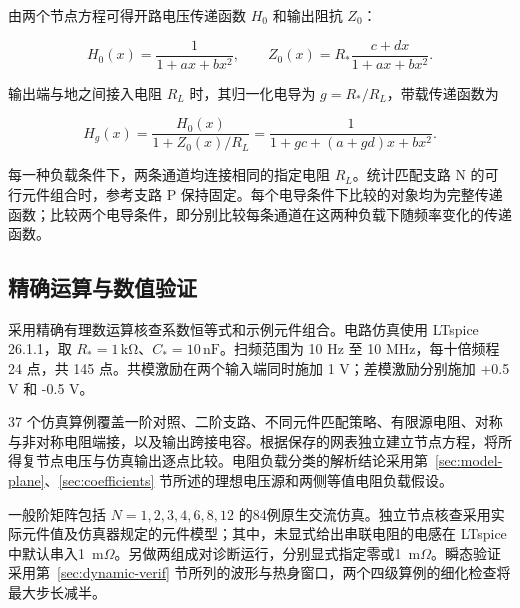 由两个节点方程可得开路电压传递函数 \(H_0\) 和输出阻抗 \(Z_0\)：

\begin{equation}\label{eq:5}
H_0(x)=\frac{1}{1+ax+bx^2},\qquad
Z_0(x)=R_*\frac{c+dx}{1+ax+bx^2}.
\end{equation}

输出端与地之间接入电阻 \(R_L\) 时，其归一化电导为 \(g=R_*/R_L\)，带载传递函数为

\begin{equation}\label{eq:6}
H_g(x)=\frac{H_0(x)}{1+Z_0(x)/R_L}
      =\frac{1}{1+gc+(a+gd)x+bx^2}.
\end{equation}

每一种负载条件下，两条通道均连接相同的指定电阻 \(R_L\)。统计匹配支路 N 的可行元件组合时，参考支路 P 保持固定。每个电导条件下比较的对象均为完整传递函数；比较两个电导条件，即分别比较每条通道在这两种负载下随频率变化的传递函数。

\subsection{精确运算与数值验证}

采用精确有理数运算核查系数恒等式和示例元件组合。电路仿真使用 LTspice 26.1.1，取 \(R_*=1\,\mathrm{k\Omega}\)、\(C_*=10\,\mathrm{nF}\)。扫频范围为 10 Hz 至 10 MHz，每十倍频程 24 点，共 145 点。共模激励在两个输入端同时施加 1 V；差模激励分别施加 +0.5 V 和 -0.5 V。

37 个仿真算例覆盖一阶对照、二阶支路、不同元件匹配策略、有限源电阻、对称与非对称电阻端接，以及输出跨接电容。根据保存的网表独立建立节点方程，将所得复节点电压与仿真输出逐点比较。电阻负载分类的解析结论采用第~\ref{sec:model-plane}、\ref{sec:coefficients} 节所述的理想电压源和两侧等值电阻负载假设。


一般阶矩阵包括 $N=1,2,3,4,6,8,12$ 的84例原生交流仿真。独立节点核查采用实际元件值及仿真器规定的元件模型；其中，未显式给出串联电阻的电感在 LTspice 中默认串入1~m$\Omega$。另做两组成对诊断运行，分别显式指定零或1~m$\Omega$。瞬态验证采用第~\ref{sec:dynamic-verif} 节所列的波形与热身窗口，两个四级算例的细化检查将最大步长减半。

\FloatBarrier
